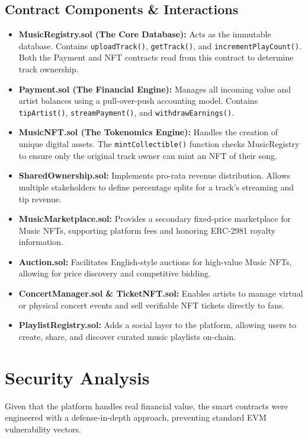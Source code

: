\documentclass[11pt,a4paper]{article}
\begin{document}
\subsection{Contract Components \& Interactions}
\begin{itemize}
    \item \textbf{MusicRegistry.sol (The Core Database):} Acts as the immutable database. Contains \texttt{uploadTrack()}, \texttt{getTrack()}, and \texttt{incrementPlayCount()}. Both the Payment and NFT contracts read from this contract to determine track ownership.
    \item \textbf{Payment.sol (The Financial Engine):} Manages all incoming value and artist balances using a pull-over-push accounting model. Contains \texttt{tipArtist()}, \texttt{streamPayment()}, and \texttt{withdrawEarnings()}.
    \item \textbf{MusicNFT.sol (The Tokenomics Engine):} Handles the creation of unique digital assets. The \texttt{mintCollectible()} function checks MusicRegistry to ensure only the original track owner can mint an NFT of their song.
    \item \textbf{SharedOwnership.sol:} Implements pro-rata revenue distribution. Allows multiple stakeholders to define percentage splits for a track's streaming and tip revenue.
    \item \textbf{MusicMarketplace.sol:} Provides a secondary fixed-price marketplace for Music NFTs, supporting platform fees and honoring ERC-2981 royalty information.
    \item \textbf{Auction.sol:} Facilitates English-style auctions for high-value Music NFTs, allowing for price discovery and competitive bidding.
    \item \textbf{ConcertManager.sol \& TicketNFT.sol:} Enables artists to manage virtual or physical concert events and sell verifiable NFT tickets directly to fans.
    \item \textbf{PlaylistRegistry.sol:} Adds a social layer to the platform, allowing users to create, share, and discover curated music playlists on-chain.
\end{itemize}

\section{Security Analysis}
Given that the platform handles real financial value, the smart contracts were engineered with a defense-in-depth approach, preventing standard EVM vulnerability vectors.
\end{document}
